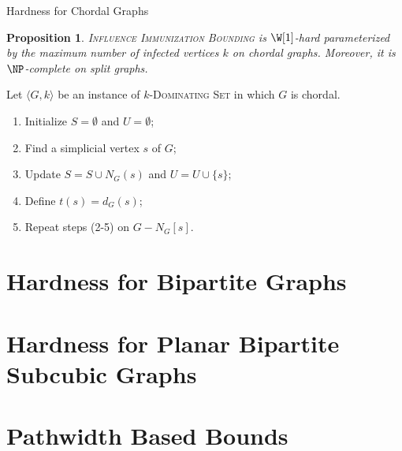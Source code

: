 \documentclass[10pt,aspectratio=169,english]{beamer}
\newtheorem{proposition}{Proposition}
\begin{document}
\begin{frame}{Hardness for Chordal Graphs}
	
	\begin{proposition}
		\textsc{Influence Immunization Bounding} is $\W[1]$-hard parameterized by the maximum number of infected vertices $k$ on chordal graphs. Moreover, it is $\NP$-complete on split graphs.
	\end{proposition}
	
	\begin{minipage}[c]{0.50\textwidth}
	\end{minipage}\begin{minipage}[c]{0.50\textwidth}
		Let $\langle G, k \rangle$ be an instance of \textsc{$k$-Dominating Set} in which $G$ is chordal.
		\begin{enumerate}
			\item Initialize $S = \emptyset$ and $U = \emptyset$;
			\item Find a simplicial vertex $s$ of $G$;
			\item Update $S = S \cup N_G(s)$ and $U = U \cup \{s\}$;
			\item Define $t(s) = d_G(s)$;
			\item Repeat steps (2-5) on $G - N_G[s]$.
		\end{enumerate}
	\end{minipage}
	
\end{frame}

\part{Hardness for Bipartite Graphs}

\begin{frame}
	\partpage
\end{frame}

\part{Hardness for Planar Bipartite Subcubic Graphs}

\begin{frame}
	\partpage
\end{frame}

\part{Pathwidth Based Bounds}

\begin{frame}
	\partpage
\end{frame}
\end{document}
